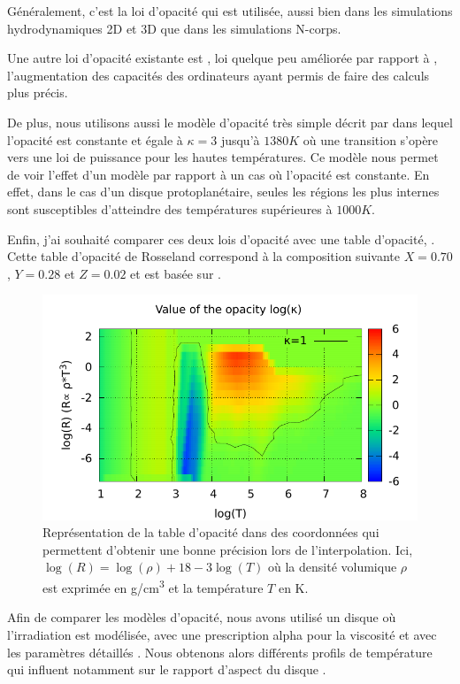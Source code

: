 \bigskip

Généralement, c'est la loi d'opacité \cite{bell1994FU} qui est utilisée, aussi bien dans les simulations hydrodynamiques 2D et
3D que dans les simulations N-corps. 

Une autre loi d'opacité existante est \cite{zhu2009nonsteady}, loi quelque peu améliorée par rapport à \cite{bell1994FU},
l'augmentation des capacités des ordinateurs ayant permis de faire des calculs plus précis. 

De plus, nous utilisons aussi le modèle d'opacité très simple décrit par \cite{chambers2009analytic} dans lequel l'opacité est
constante et égale à $\kappa=3$ jusqu'à $1380\unit{K}$ où une transition s'opère vers une loi de puissance pour les hautes températures. Ce modèle nous
permet de voir l'effet d'un modèle par rapport à un cas où l'opacité est constante. En effet, dans le cas d'un disque
protoplanétaire, seules les régions les plus internes sont susceptibles d'atteindre des températures supérieures à
$1000\unit{K}$. 

Enfin, j'ai souhaité comparer ces deux lois d'opacité avec une table d'opacité, \cite{hure2000transition} . Cette table
d'opacité de Rosseland correspond à la composition suivante $X=0.70$, $Y=0.28$ et $Z=0.02$ et est basée sur
\cite{seaton1994opacities, alexander1994low, henning1996dust}.

\begin{figure}[htbp]
\centering
\includegraphics[width=0.65\linewidth]{figure/hure_opacity_table.pdf}
\caption[Représentation de la table d'opacité \cite{hure2000transition}.]{Représentation de la table d'opacité
\cite{hure2000transition} dans des coordonnées qui permettent d'obtenir une bonne précision lors de l'interpolation. Ici,
$\log(R)=\log(\rho) + 18 -3\log(T)$ où la densité volumique $\rho$ est exprimée en \unit{g/cm^3} et la température $T$ en
K.}\label{fig:hure_profile}
\end{figure}

Afin de comparer les modèles d'opacité, nous avons utilisé un disque où l'irradiation est modélisée, avec une prescription alpha pour la viscosité et avec les paramètres détaillés . Nous obtenons alors différents profils de température qui influent notamment sur le rapport d'aspect du disque . 

